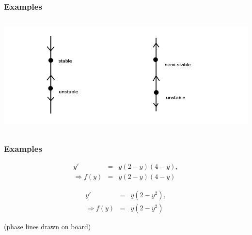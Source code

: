 \begin{frame}
  \frametitle{Examples}
  
  \includegraphics[height=6cm]{img/week3PhaseLine}

\end{frame}

\begin{frame}
  \frametitle{Examples}


  \begin{eqnarray*}
    y' & = & y(2-y)(4-y), \\
    \Rightarrow f(y) & = & y(2-y)(4-y)
  \end{eqnarray*}

  \begin{eqnarray*}
    y' & = & y(2-y^2), \\
    \Rightarrow f(y) & = & y(2-y^2)
  \end{eqnarray*}

  (phase lines drawn on board)

\end{frame}

